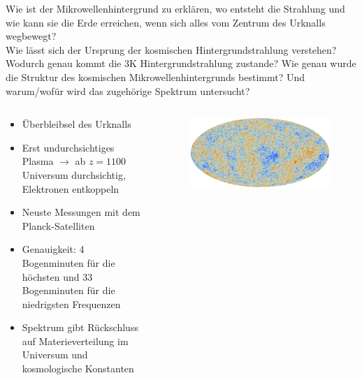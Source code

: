   \begin{frame}{Wie ist der Mikrowellenhintergrund zu erklären, wo entsteht die Strahlung
  und wie kann sie die Erde erreichen, wenn sich alles vom Zentrum des Urknalls
  wegbewegt?\\
    Wie lässt sich der Ursprung der kosmischen Hintergrundstrahlung verstehen?\\
    Wodurch genau kommt die 3K Hintergrundstrahlung zustande? Wie genau wurde die Struktur des kosmischen Mikrowellenhintergrunds bestimmt?
    Und warum/wofür wird das zugehörige Spektrum untersucht?}
    \begin{columns}
   \begin{column}{0.5\textwidth}
    \begin{itemize}
      \setlength\itemsep{1em}
      \item Überbleibsel des Urknalls
      \item Erst undurchsichtiges Plasma $\rightarrow$ ab $z=1100$ Universum durchsichtig, Elektronen entkoppeln
      \item Neuste Messungen mit dem Planck-Satelliten
      \item Genauigkeit: 4 Bogenminuten für die höchsten und 33 Bogenminuten für die niedrigsten Frequenzen
      \item Spektrum gibt Rückschluss auf Materieverteilung im Universum und kosmologische Konstanten
     \end{itemize}
  \vspace{2em}
  \end{column}
  \begin{column}{0.5\textwidth}
  \begin{figure}
    \centering
    \includegraphics[width=\textwidth]{images/planck.jpg}
  \end{figure}
  \end{column}
    \end{columns}
  \end{frame}

